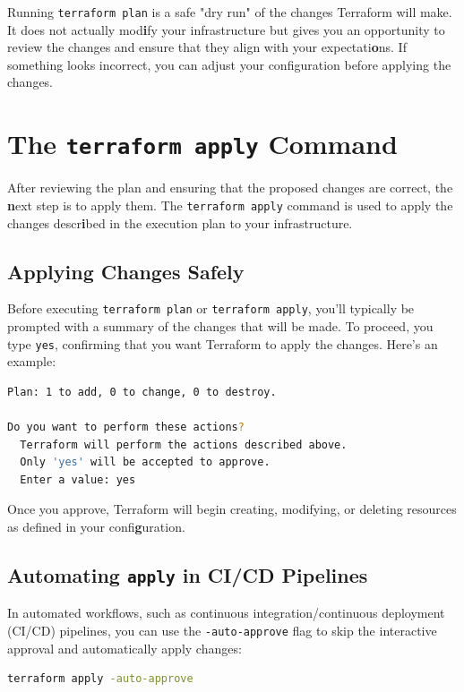 Running \texttt{terraform plan} is a safe "dry run" of the changes Terraform will make. It does not actually mod\textbf{i}fy your infrastructure but gives you an opportunity to review the changes and ensure that they align with your expectati\textbf{o}ns. If something looks incorrect, you can adjust your configuration before applying the changes.

\section{The \texttt{terraform apply} Command}

After reviewing the plan and ensuring that the proposed changes are correct, the \textbf{n}ext step is to apply them. The \texttt{terraform apply} command is used to apply the changes descr\textbf{i}bed in the execution plan to your infrastructure.

\subsection{Applying Changes Safely}

Before executing \texttt{terraform plan} or \texttt{terraform apply}, you'll typically be prompted with a summary of the changes that will be made. To proceed, you type \texttt{yes}, confirming that you want Terraform to apply the changes. Here's an example:

\begin{lstlisting}[language=bash]
Plan: 1 to add, 0 to change, 0 to destroy.

Do you want to perform these actions?
  Terraform will perform the actions described above.
  Only 'yes' will be accepted to approve.
  Enter a value: yes
\end{lstlisting}

Once you approve, Terraform will begin creating, modifying, or deleting resources as defined in your confi\textbf{g}uration.

\subsection{Automating \texttt{apply} in CI/CD Pipelines}

In automated workflows, such as continuous integration/continuous deployment (CI/CD) pipelines, you can use the \texttt{-auto-approve} flag to skip the interactive approval and automatically apply changes:

\begin{lstlisting}[language=bash]
terraform apply -auto-approve
\end{lstlisting}

